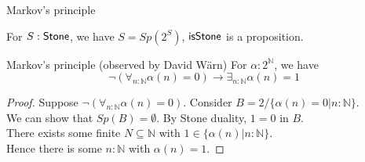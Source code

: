 
\begin{frame}{Markov's principle}
  \begin{corollary}
    For $S:\mathsf{Stone}$, we have $S = Sp(2^S)$,
    $\mathsf{isStone}$ is a proposition.
  \end{corollary}
  \pause
  \begin{block}{Markov's principle (observed by David W\"arn)}
    For $\alpha:2^\mathbb N$, we have 
    \vspace{-0.2cm}
    $$\neg (\forall_{n:\mathbb N} \alpha(n) = 0) \to 
    \exists_{n:\mathbb N} \alpha(n) = 1
    $$
  \end{block}
  \begin{proof}
    Suppose $\neg(\forall_{n:\mathbb N}\alpha(n) = 0)$. 
    \pause 
    Consider $B = 2/\{\alpha(n)=0|n:\mathbb N\}$. \\
    \pause 
    We can show that $Sp(B) = \emptyset$. \pause
    By Stone duality, $1=0$ in $B$. 
    \\\pause 
    There exists some finite $N\subseteq \mathbb N$
    with $1\in \{\alpha(n)|n:\mathbb N\}$. 
    \pause \\
    Hence there is some $n:\mathbb N$ with $\alpha(n) = 1$. 
  \end{proof}
\end{frame}


